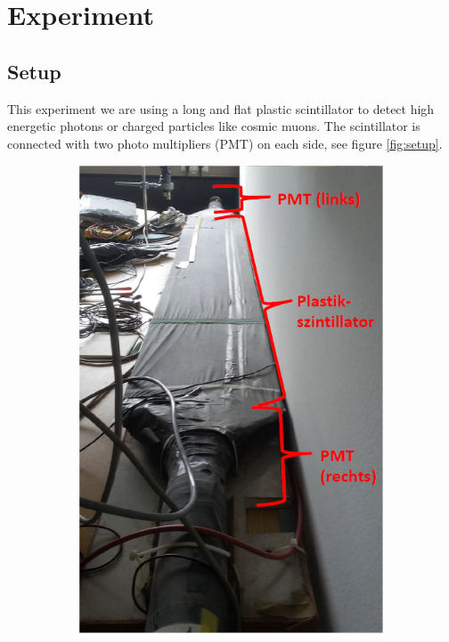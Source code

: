 \documentclass[]{article}
\begin{document}
\newpage
\section{Experiment}
\subsection{Setup}\label{setup}
This experiment we are using a long and flat plastic scintillator to detect high energetic photons or charged particles like cosmic muons. The scintillator is connected with two photo multipliers (PMT) on each side, see figure \ref{fig:setup}.

\begin{figure}[H]
\centering
\begin{subfigure}[h]{0.4\textwidth}
\includegraphics[width=1\textwidth]{Plots/Scintillator.jpg}

\end{subfigure}
\end{figure}
\end{document}
